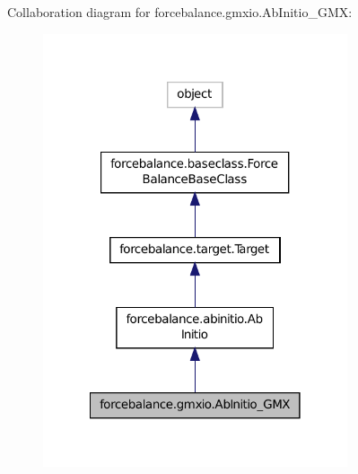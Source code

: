 Collaboration diagram for forcebalance.\-gmxio.\-Ab\-Initio\-\_\-\-G\-M\-X\-:\nopagebreak
\begin{figure}[H]
\begin{center}
\leavevmode
\includegraphics[width=254pt]{classforcebalance_1_1gmxio_1_1AbInitio__GMX__coll__graph}
\end{center}
\end{figure}
